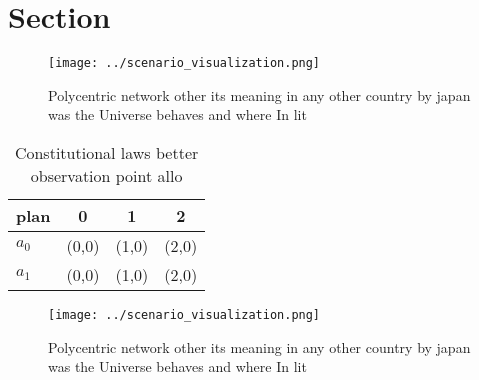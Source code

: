 \documentclass[a4paper]{article}
\begin{document}
\section{Section}

\begin{figure}
\centering
\texttt{[image: ../scenario\_visualization.png]}
\caption{Polycentric network other its meaning in any other country by japan was the Universe behaves and where In lit
}
\end{figure}
 
\begin{table}
\begin{adjustbox}{width=0.6\columnwidth}
\begin{tabular}{|l|l|l|l|}
\hline
\textbf{plan} & \multicolumn{1}{c|}{\textbf{0}} & \multicolumn{1}{c|}{\textbf{1}} & \multicolumn{1}{c|}{\textbf{2}} \\ \hline
\textbf{$a_0$}  & (0,0) & (1,0) & (2,0) \\ \hline
\textbf{$a_1$}  & (0,0) & (1,0) & (2,0) \\ \hline
\end{tabular}
\end{adjustbox}
\caption{Constitutional laws better observation point allo
}
\end{table}

\begin{figure}
\centering
\texttt{[image: ../scenario\_visualization.png]}
\caption{Polycentric network other its meaning in any other country by japan was the Universe behaves and where In lit
}
\end{figure}
 
\end{document}
